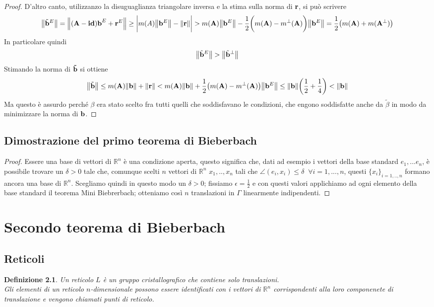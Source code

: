 \documentclass[a4paper,11pt,openright,twoside	]{book}
\newtheorem{definition}{Definizione}[section]
\begin{document}
\begin{proof}
D'altro canto, utilizzanzo la disuguaglianza triangolare inversa e la stima sulla norma di $\vb{r}$, si può scrivere
\[ \norm{\tilde{\vb{b}}^{E} }= \norm{(\vb{A-id) b}^{E} + \vb{r}^{E}} \geq \bigg| m(A) \norm{\vb{b}^E} - \norm{\vb{r}}\bigg| > m(\vb{A}) \norm{\vb{b}^E} - \frac{1}{2} \bigg( m(\vb{A}) - m^{\perp}(\vb{A})\bigg)\norm{\vb{b}^E} =  \frac{1}{2} \big( m(\vb{A}) + m(\vb{A}^{\perp}) \big)\]
In particolare quindi 
\[ \norm{\tilde{\vb{b}}^{E}} > \norm{\tilde{\vb{b}}^{\perp}}\]
Stimando la norma di $\vb{\tilde{b}}$ si ottiene 
\[ \norm{\tilde{\vb{b}}} \leq m(\vb{A}) \norm{\vb{b}} + \norm{\vb{r}} < m(\vb{A})\norm{\vb{b}} + \frac{1}{2} \big( m(\vb{A}) - m^{\perp}(\vb{A}) \big)\norm{\vb{b}^{E}} \leq  \norm{\vb{b}} \bigg( \frac{1}{2} + \frac{1}{4}\bigg) < \norm{\vb{b}} \]
Ma questo è assurdo perché $\beta$ era stato scelto fra tutti quelli che soddisfavano le condizioni, che engono soddisfatte anche da $\tilde{\beta}$  in modo da minimizzare la norma di $\vb{b}$.
\end{proof}

\section{Dimostrazione del primo teorema di Bieberbach}
\begin{proof}
Essere una base di vettori di $\mathbb{R}^n$ è una condizione aperta, questo significa che, dati ad esempio i vettori della base standard $ e_1, ...e_n$, è possibile trovare un $\delta >0$  tale che, comunque scelti $n $ vettori di $\mathbb{R}^n$ $x_1, .., x_n$ tali che $ \angle(e_i, x_i) \leq \delta   \; \; \forall i = 1, ..., n$, questi $\{x_i \}_{i=1,..,n}$ formano ancora una base di $\mathbb{R}^n$.
Scegliamo quindi in questo modo un $\delta >0$; fissiamo $\epsilon = \frac{1}{2}$ e con questi valori applichiamo ad ogni elemento della base standard il teorema Mini Biebrerbach; otteniamo così $n$ translazioni in $\Gamma$ linearmente indipendenti. 
\end{proof}

\chapter{Secondo teorema di Bieberbach}

\section{Reticoli}
\begin{definition}
Un reticolo $L$ è un gruppo cristallografico che contiene solo translazioni. \\
Gli elementi di un reticolo $n$-dimensionale possono essere identificati con i vettori di $\mathbb{R}^n$ corrispondenti alla loro componenete di translazione e vengono chiamati punti di reticolo. 
\end{definition}
\end{document}
